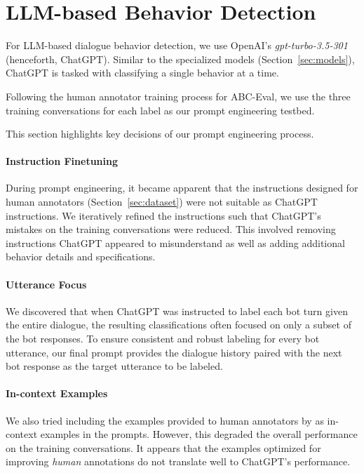 \section{LLM-based Behavior Detection}
\label{sec:gpt_llm}

For LLM-based dialogue behavior detection, we use OpenAI’s \textit{gpt-turbo-3.5-301} (henceforth, \linebreak ChatGPT). Similar to the specialized models (Section~\ref{sec:models}), ChatGPT is tasked with classifying a single behavior at a time.

Following the human annotator training process for ABC-Eval, we use the three training conversations for each label as our prompt engineering testbed.

This section highlights key decisions of our prompt engineering process.

\paragraph{Instruction Finetuning}

During prompt engineering, it became apparent that the instructions designed for human annotators (Section~\ref{sec:dataset}) were not suitable as ChatGPT instructions. We iteratively refined the instructions such that ChatGPT's mistakes on the training conversations were reduced. This involved removing instructions ChatGPT appeared to misunderstand as well as adding additional behavior details and specifications.

\paragraph{Utterance Focus} 

We discovered that when ChatGPT was instructed to label each bot turn given the entire dialogue, the resulting classifications often focused on only a subset of the bot responses. To ensure consistent and robust labeling for every bot utterance, our final prompt provides the dialogue history paired with the next bot response as the target utterance to be labeled.

\paragraph{In-context Examples}

We also tried including the examples provided to human annotators by \citet{finch:23} as in-context examples in the prompts. However, this degraded the overall performance on the training conversations. It appears that the examples optimized for improving \textit{human} annotations do not translate well to ChatGPT's performance.

